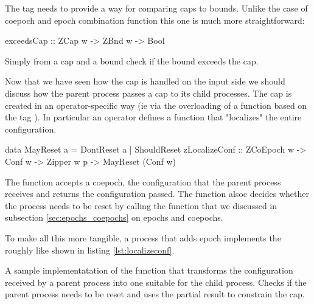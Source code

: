 The  tag needs to provide a way for comparing caps
to bounds. Unlike the case of coepoch and epoch combination function
this one is much more straightforward:

\begin{haskellcode}
exceedsCap :: ZCap w -> ZBnd w -> Bool
\end{haskellcode}

Simply from a cap and a bound check if the bound exceeds the cap.

Now that we have seen how the cap is handled on the input side we
should discuss how the parent process passes a cap to its child
processes. The cap is created in an operator-specific way (ie via the
overloading of a function based on the tag ). In particular an
operator defines a function that "localizes" the entire configuration.

\begin{haskellcode}
data MayReset a = DontReset a | ShouldReset
zLocalizeConf :: ZCoEpoch w -> Conf w -> Zipper w p -> MayReset (Conf w)
\end{haskellcode}

The  function accepts a coepoch, the configuration
that the parent process receives and returns the configuration
passed. The  function alsoc decides whether the
process needs to be reset by calling the 
function that we discussed in subsection \ref{sec:epochs_coepochs} on
epochs and coepochs.

To make all this more tangible, a process that adds epoch implements
the  roughly like shown in listing
\ref{lst:localizeconf}.

\begin{code}

  \caption{\label{lst:localizeconf}A sample implementatation of the
    function that transforms the configuration received by a parent
    process into one suitable for the child process. Checks if the
    parent process needs to be reset and uses the partial result to
    constrain the cap.}
\end{code}

